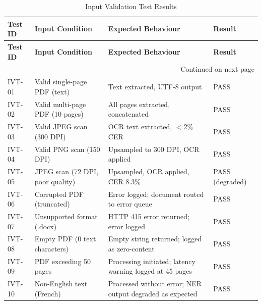 \begin{longtable}{|p{1.5cm}|p{4cm}|p{4.5cm}|p{2cm}|}
\caption{Input Validation Test Results}
\label{tab:input_validation}\\

\hline
\textbf{Test ID} &
\textbf{Input Condition} &
\textbf{Expected Behaviour} &
\textbf{Result} \\
\hline
\endfirsthead

\hline
\textbf{Test ID} &
\textbf{Input Condition} &
\textbf{Expected Behaviour} &
\textbf{Result} \\
\hline
\endhead

\hline
\multicolumn{4}{r}{Continued on next page} \\
\endfoot

\hline
\endlastfoot


IVT-01 &
Valid single-page PDF (text) &
Text extracted, UTF-8 output &
PASS \\
\hline

IVT-02 &
Valid multi-page PDF (10 pages) &
All pages extracted, concatenated &
PASS \\
\hline

IVT-03 &
Valid JPEG scan (300 DPI) &
OCR text extracted, $<2\%$ CER &
PASS \\
\hline

IVT-04 &
Valid PNG scan (150 DPI) &
Upsampled to 300 DPI, OCR applied &
PASS \\
\hline

IVT-05 &
JPEG scan (72 DPI, poor quality) &
Upsampled, OCR applied, CER 8.3\% &
PASS (degraded) \\
\hline

IVT-06 &
Corrupted PDF (truncated) &
Error logged; document routed to error queue &
PASS \\
\hline

IVT-07 &
Unsupported format (.docx) &
HTTP 415 error returned; error logged &
PASS \\
\hline

IVT-08 &
Empty PDF (0 text characters) &
Empty string returned; logged as zero-content &
PASS \\
\hline

IVT-09 &
PDF exceeding 50 pages &
Processing initiated; latency warning logged at 45 pages &
PASS \\
\hline

IVT-10 &
Non-English text (French) &
Processed without error; NER output degraded as expected &
PASS \\
\hline

\end{longtable}

